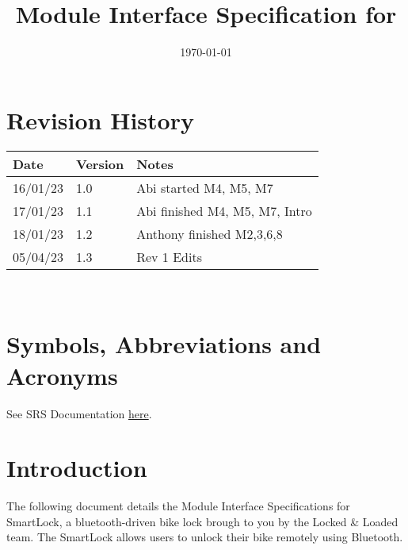 \documentclass[12pt, titlepage]{article}
\begin{document}
\title{Module Interface Specification for \progname{}}

\author{\authname}

\date{\today}

\maketitle


\section{Revision History}

\begin{tabularx}{\textwidth}{p{3cm}p{2cm}X}
\toprule {\bf Date} & {\bf Version} & {\bf Notes}\\
\midrule
16/01/23 & 1.0 & Abi started M4, M5, M7\\
17/01/23  & 1.1 & Abi finished M4, M5, M7, Intro\\
18/01/23 & 1.2 & Anthony finished M2,3,6,8\\
05/04/23 & 1.3 & Rev 1 Edits\\
\bottomrule
\end{tabularx}

~\newpage

\section{Symbols, Abbreviations and Acronyms}

See SRS Documentation \href{https://github.com/NevoAbigail/Capstone/blob/main/docs/SRS/SRS.pdf}{here}.


\newpage

\tableofcontents

\newpage


\section{Introduction}

The following document details the Module Interface Specifications for
SmartLock, a bluetooth-driven bike lock brough to you by the Locked \& Loaded team. The SmartLock allows users to unlock their bike remotely using Bluetooth. 
\end{document}
